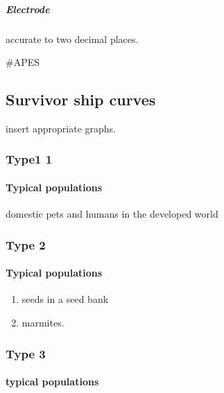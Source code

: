 \documentclass[]{article}
\providecommand{\tightlist}{%
  \setlength{\itemsep}{0pt}\setlength{\parskip}{0pt}}
\let\oldparagraph\paragraph
\renewcommand{\paragraph}[1]{\oldparagraph{#1}\mbox{}}
\let\oldsubparagraph\subparagraph
\renewcommand{\subparagraph}[1]{\oldsubparagraph{#1}\mbox{}}
\begin{document}
\hypertarget{electrode}{%
\subparagraph{Electrode}\label{electrode}}

accurate to two decimal places.

\#APES

\hypertarget{survivor-ship-curves}{%
\subsection{Survivor ship curves}\label{survivor-ship-curves}}

insert appropriate graphs.

\hypertarget{type1-1}{%
\subsubsection{Type1 1}\label{type1-1}}

\hypertarget{typical-populations}{%
\paragraph{Typical populations}\label{typical-populations}}

domestic pets and humans in the developed world

\hypertarget{type-2}{%
\subsubsection{Type 2}\label{type-2}}

\hypertarget{typical-populations-1}{%
\paragraph{Typical populations}\label{typical-populations-1}}

\begin{enumerate}
\def\labelenumi{\arabic{enumi}.}
\tightlist
\item
  seeds in a seed bank
\item
  marmites.
\end{enumerate}

\hypertarget{type-3}{%
\subsubsection{Type 3}\label{type-3}}

\hypertarget{typical-populations-2}{%
\paragraph{typical populations}\label{typical-populations-2}}
\end{document}
